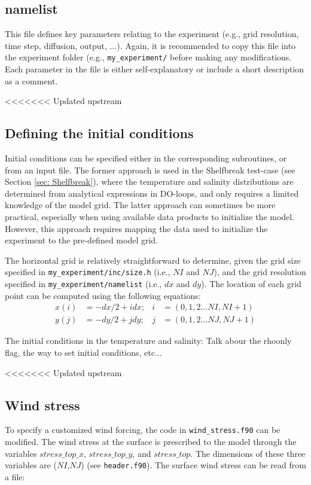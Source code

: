 \documentclass[12pt,letterpaper,titlepage]{article}
\begin{document}
\subsection{namelist}
\label{sec: namelist}
This file defines key parameters relating to the experiment (e.g., grid resolution, time step, diffusion, output, ...). Again, it is recommended to copy this file into the experiment folder (e.g., \texttt{my\_experiment/} before making any modifications. Each parameter in the file is either self-explanatory or include a short description as a comment.

<<<<<<< Updated upstream
\subsection{Defining the initial conditions}
Initial conditions can be specified either in the corresponding subroutines, or from an input file. The former approach is used in the Shelfbreak test-case (see Section \ref{sec: Shelfbreak}), where the temperature and salinity distributions are determined from analytical expressions in DO-loops, and only requires a limited knowledge of the model grid. The latter approach can sometimes be more practical, especially when using available data products to initialize the model. However, this approach requires mapping the data used to initialize the experiment to the pre-defined model grid. 

The horizontal grid is relatively straightforward to determine, given the grid size specified in \texttt{my\_experiment/inc/size.h} (i.e., $NI$ and $NJ$), and the grid resolution specified in \texttt{my\_experiment/namelist} (i.e., $dx$ and $dy$). The location of each grid point can be computed using the following equations:
\begin{align}
x(i) &= -dx/2 + i dx; &i &= (0, 1 , 2 \ldots NI, NI+1)\\
y(j) &= -dy/2 + j dy; &j &= (0, 1 , 2 \ldots NJ, NJ+1)
\end{align}

The initial conditions in the temperature and salinity: Talk abour the rhoonly flag, the way to set initial conditions, etc...

<<<<<<< Updated upstream
\subsection{Wind stress}
To specify a customized wind forcing, the code in \texttt{wind\_stress.f90} can be modified. The wind stress at the surface is prescribed to the model through the variables $stress\_top\_x$, $stress\_top\_y$, and $stress\_top$. The dimensions of these three variables are ($NI$,$NJ$) (see \texttt{header.f90}). The surface wind stress can be read from a file: 
\end{document}
